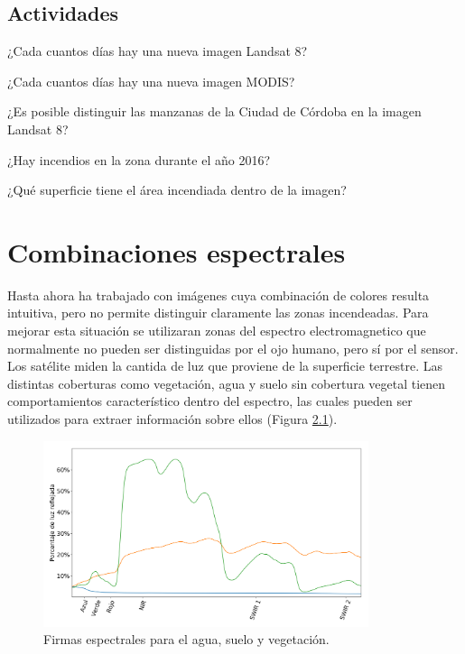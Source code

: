 \documentclass[a4paper,12pt]{book}
\begin{document}
\section{Actividades}
\begin{que}
    ¿Cada cuantos días hay una nueva imagen Landsat 8?
\end{que}
\begin{que}
    ¿Cada cuantos días hay una nueva imagen MODIS?
\end{que}
\begin{que}
    ¿Es posible distinguir las manzanas de la Ciudad de Córdoba en la imagen Landsat 8?
\end{que}
\begin{que}
    ¿Hay incendios en la zona durante el año 2016?
\end{que}
\begin{que}
    ¿Qué superficie tiene el área incendiada dentro de la imagen?
\end{que}

\chapter{Combinaciones espectrales}

Hasta ahora ha trabajado con imágenes cuya combinación de colores resulta intuitiva, pero no permite distinguir claramente las zonas incendeadas. Para mejorar esta situación se utilizaran zonas del espectro electromagnetico que normalmente no pueden ser distinguidas por el ojo humano, pero sí por el sensor.
Los satélite miden la cantida de luz que proviene de la superficie terrestre. Las distintas coberturas como vegetación, agua y suelo sin cobertura vegetal tienen comportamientos característico dentro del espectro, las cuales pueden ser utilizados para extraer información sobre ellos (Figura \ref{fig:spec}).



\begin{figure}[h!]
    \centering
    \includegraphics[width=0.85\textwidth]{fig:spec.png}
    \caption{Firmas espectrales para el agua, suelo y vegetación.}
    \label{fig:spec}
\end{figure}
\end{document}
